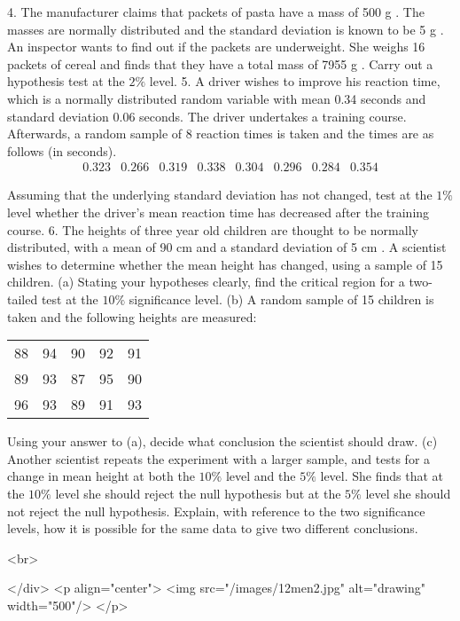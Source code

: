 4. The manufacturer claims that packets of pasta have a mass of 500 g . The masses are normally distributed and the standard deviation is known to be 5 g . An inspector wants to find out if the packets are underweight. She weighs 16 packets of cereal and finds that they have a total mass of 7955 g . Carry out a hypothesis test at the $2 \%$ level.
5. A driver wishes to improve his reaction time, which is a normally distributed random variable with mean 0.34 seconds and standard deviation 0.06 seconds. The driver undertakes a training course. Afterwards, a random sample of 8 reaction times is taken and the times are as follows (in seconds).
$$
\begin{array}{llllllll}
0.323 & 0.266 & 0.319 & 0.338 & 0.304 & 0.296 & 0.284 & 0.354
\end{array}
$$

Assuming that the underlying standard deviation has not changed, test at the $1 \%$ level whether the driver's mean reaction time has decreased after the training course.
6. The heights of three year old children are thought to be normally distributed, with a mean of 90 cm and a standard deviation of 5 cm . A scientist wishes to determine whether the mean height has changed, using a sample of 15 children.
(a) Stating your hypotheses clearly, find the critical region for a two-tailed test at the $10 \%$ significance level.
(b) A random sample of 15 children is taken and the following heights are measured:

\begin{tabular}{ccccc}
88 & 94 & 90 & 92 & 91 \\
89 & 93 & 87 & 95 & 90 \\
96 & 93 & 89 & 91 & 93
\end{tabular}

Using your answer to (a), decide what conclusion the scientist should draw.
(c) Another scientist repeats the experiment with a larger sample, and tests for a change in mean height at both the $10 \%$ level and the $5 \%$ level. She finds that at the $10 \%$ level she should reject the null hypothesis but at the $5 \%$ level she should not reject the null hypothesis. Explain, with reference to the two significance levels, how it is possible for the same data to give two different conclusions.

<br>

</div>
<p align="center">
<img src="/images/12men2.jpg" alt="drawing" width="500"/>
</p>
